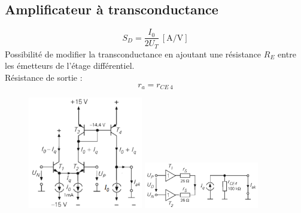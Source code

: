 \documentclass[resume]{subfiles}
\begin{document}
\begin{multicols}{3}
\subsection{Amplificateur à transconductance}
$$S_D=\frac{I_0}{2U_T}\ \left[\si{\ampere\per\volt}\right]$$
Possibilité de modifier la transconductance en ajoutant une résistance $R_E$ entre les émetteurs de l'étage différentiel.\\
Résistance de sortie :
$$r_a=r_{CE\ 4}$$
\begin{center}
\begin{figure}[H]
\centering
\includegraphics[width=5.00cm]{img_53.png}
\includegraphics[width=5.00cm]{img_54.png}
\end{figure}
\end{center}

\end{multicols}
\end{document}
